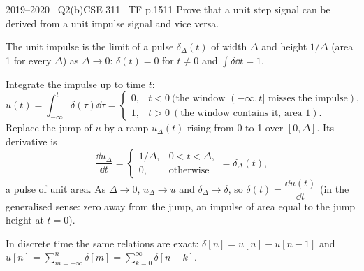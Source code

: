 \begin{qcard}{2019--2020 \textbullet\ Q2(b)}{CSE 311 \textbullet\ TF p.15}{11}
Prove that a unit step signal can be derived from a unit impulse signal and vice versa.
\end{qcard}
\begin{solution}
 The unit impulse is the limit of a pulse $\delta_\Delta(t)$ of width $\Delta$ and height $1/\Delta$ (area 1 for every $\Delta$) as $\Delta\to0$: $\delta(t)=0$ for $t\neq0$ and $\int\delta\dd t=1$.

 Integrate the impulse up to time $t$:
\[
u(t)=\int_{-\infty}^{t}\delta(\tau)\dd\tau=\begin{cases}0,&t<0\ (\text{the window }(-\infty,t]\text{ misses the impulse}),\\1,&t>0\ (\text{the window contains it, area }1).\end{cases}
\]
 Replace the jump of $u$ by a ramp $u_\Delta(t)$ rising from 0 to 1 over $[0,\Delta]$. Its derivative is
\[\frac{\dd u_\Delta}{\dd t}=\begin{cases}1/\Delta,&0<t<\Delta,\\0,&\text{otherwise}\end{cases}=\delta_\Delta(t),\]
a pulse of unit area. As $\Delta\to0$, $u_\Delta\to u$ and $\delta_\Delta\to\delta$, so $\delta(t)=\dfrac{\dd u(t)}{\dd t}$ (in the generalised sense: zero away from the jump, an impulse of area equal to the jump height at $t=0$).

In discrete time the same relations are exact: $\delta[n]=u[n]-u[n-1]$ and $u[n]=\sum_{m=-\infty}^{n}\delta[m]=\sum_{k=0}^\infty\delta[n-k]$.
\end{solution}

